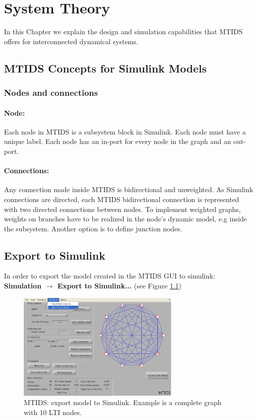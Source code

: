 \documentclass[a4paper,twoside, openright,12pt]{report}
\begin{document}
\chapter{System Theory}\label{chapter3}

In this Chapter we explain the design and simulation capabilities that MTIDS offers for interconnected dynamical systems.

\section{MTIDS Concepts for Simulink Models} \label{subsystemConcept}
\subsection{Nodes and connections}
\subsubsection{Node:}
Each node in MTIDS is a subsystem block in Simulink. Each node must have a unique label.
Each node has an in-port for every node in the graph and an out-port. 
\subsubsection{Connections:}
Any connection made inside MTIDS is bidirectional and unweighted. As Simulink connections are directed, each MTIDS bidirectional connection
 is represented with two directed connections between nodes. To implement weighted graphs, weights 
on branches have to be realized in the node's dynamic model, e.g inside the subsystem. Another option is to define junction nodes.

\section{Export to Simulink}\label{exportToSimulink}
In order to export the model created in the MTIDS GUI to simulink: \textbf{Simulation $\rightarrow$ Export to Simulink...} (see Figure \ref{exportFig})
\\
\begin{figure}[htb]
\centering
\includegraphics[width=0.7\textwidth]{pics/screenExport.eps}
\caption[MTIDS export to Simulink]{MTIDS: export model to Simulink. Example is a complete graph with 10 LTI nodes. }
\label{exportFig}
\end{figure}
\end{document}
